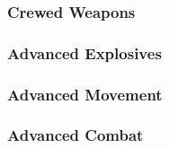 

\subsubsection*{Crewed Weapons}



\subsubsection*{Advanced Explosives}



\subsubsection*{Advanced Movement}



\subsubsection*{Advanced Combat}


